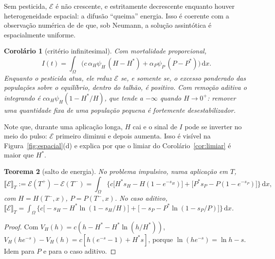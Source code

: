 \documentclass[11pt,a4paper]{article}
\numberwithin{equation}{section}
\newtheorem{teorema}{Teorema}[section]
\newtheorem{corolario}[teorema]{Corolário}
\theoremstyle{definition}
\theoremstyle{remark}
\newcommand{\E}{\mathcal{E}}
\newcommand{\jump}[1]{\llbracket #1 \rrbracket}
\newcommand{\dd}{\,\mathrm{d}}
\newcommand{\Hs}{H^{*}}
\newcommand{\Ps}{P^{*}}
\begin{document}
Sem pesticida, $\E$ é não crescente, e estritamente decrescente enquanto houver
heterogeneidade espacial: a difusão ``queima'' energia. Isso é coerente com a observação
numérica de \cite{LiYang} de que, sob Neumann, a solução assintótica é espacialmente uniforme.

\begin{corolario}[critério infinitesimal]\label{cor:infinitesimal}
Com mortalidade proporcional,
\[
I(t)=\int_\Omega\Big(c\,\alpha_H\psi_H\,(H-\Hs)+\alpha_P\psi_P\,(P-\Ps)\Big)\dd x .
\]
Enquanto o pesticida atua, ele reduz $\E$ se, e somente se, o excesso ponderado das
populações sobre o equilíbrio, \emph{dentro do talhão}, é positivo. Com remoção aditiva o
integrando é $c\alpha_H\psi_H(1-\Hs/H)$, que tende a $-\infty$ quando $H\to0^+$: remover uma
quantidade fixa de uma população pequena é fortemente desestabilizador.
\end{corolario}

Note que, durante uma aplicação longa, $H$ cai e o sinal de $I$ pode se inverter no meio do
pulso: $\E$ primeiro diminui e depois aumenta. Isso é visível na Figura~\ref{fig:espacial}(d)
e explica por que o limiar do Corolário~\ref{cor:limiar} é maior que $\Hs$.

\begin{teorema}[salto de energia]\label{teo:salto}
No problema impulsivo, numa aplicação em $T$,
\begin{equation}\label{eq:saltoE}
\jump{\E}_T:=\E(T^+)-\E(T^-)=\int_\Omega\Big\{c\big[\Hs s_H-H(1-e^{-s_H})\big]
+\big[\Ps s_P-P(1-e^{-s_P})\big]\Big\}\dd x,
\end{equation}
com $H=H(T^-,x)$, $P=P(T^-,x)$. No caso aditivo,
$\jump{\E}_T=\int_\Omega\big\{c\big[-s_H-\Hs\ln(1-s_H/H)\big]+\big[-s_P-\Ps\ln(1-s_P/P)\big]\big\}\dd x$.
\end{teorema}

\begin{proof}
Com $V_H(h)=c(h-\Hs-\Hs\ln(h/\Hs))$,
$V_H(he^{-s})-V_H(h)=c[h(e^{-s}-1)+\Hs s]$, porque $\ln(he^{-s})=\ln h-s$. Idem para $P$ e para o
caso aditivo.
\end{proof}
\end{document}
